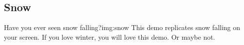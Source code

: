 \subsection{Snow}
%
{Have you ever seen snow falling?}{img:snow}
This demo replicates snow falling on your screen. If you love winter,
you will love this demo.  Or maybe not.

